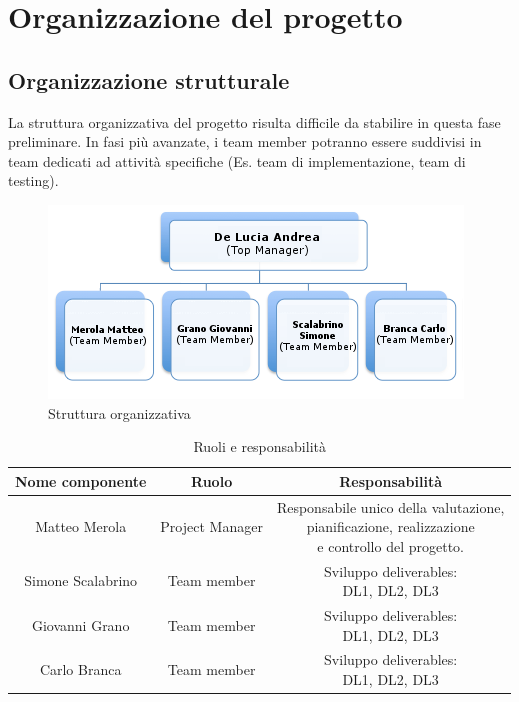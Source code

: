 \chapter{Organizzazione del progetto}	
		
		\section{Organizzazione strutturale}
		\label{sec:struc}
		
		La struttura organizzativa del progetto risulta difficile da stabilire in questa fase preliminare. In fasi più avanzate, i team member potranno essere suddivisi in team dedicati ad attività specifiche (Es. team di implementazione, team di testing).
		
		\begin{figure}
		\centering
		\includegraphics{img/organizzazione.png}
		\caption{Struttura organizzativa}\label{fig:1}
		\end{figure}
		
		\begin{table}[b]
			\begin{tabular}{|c|c|c|}
				\hline
				\textbf{Nome componente} & \textbf{Ruolo} & \textbf{Responsabilità}\\
				\hline
				Matteo Merola & Project Manager & \shortstack{Responsabile unico della valutazione, \\pianificazione, realizzazione \\e controllo del progetto.}\\
				\hline
				Simone Scalabrino & Team member &  \shortstack{Sviluppo deliverables:\\DL1, DL2, DL3}\\
				\hline
				Giovanni Grano & Team member & \shortstack{Sviluppo deliverables:\\DL1, DL2, DL3}\\
				\hline
				Carlo Branca & Team member & \shortstack{Sviluppo deliverables:\\DL1, DL2, DL3}\\
				\hline
			\end{tabular}
		\caption{Ruoli e responsabilità}
		\label{proj_org:ruoli}
		\end {table}
		